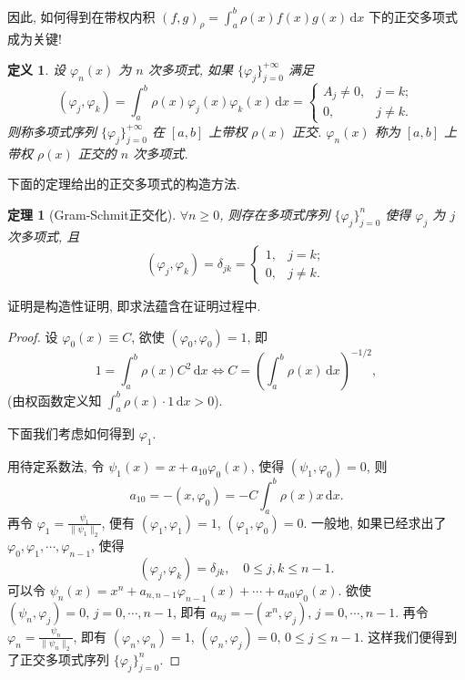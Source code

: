 \documentclass[UTF8, a4paper, 11pt]{ctexart}
\newtheorem{definition}{定义}[section]
\newtheorem{theorem}{定理}[section]
\begin{document}
因此, 如何得到在带权内积 $ (f, g)_{\rho} = \int_a^b \rho(x) f(x) g(x) \, \mathrm{d} x $ 下的正交多项式成为关键!
\begin{definition}
    设 $ \varphi_n(x) $ 为 $ n $ 次多项式, 如果 $ \{\varphi_j\}_{j=0}^{+\infty} $ 满足
\[ (\varphi_j, \varphi_k) = \int_a^b \rho(x) \varphi_j(x) \varphi_k(x) \, \mathrm{d} x = \left\{
\begin{array}{ll}
A_j \neq 0, & j = k; \\
0, & j \neq k.
\end{array}
\right. \]
则称多项式序列 $ \{\varphi_j\}_{j=0}^{+\infty} $ 在 $[a, b]$ 上带权 $ \rho(x) $ 正交. $ \varphi_n(x) $ 称为 $[a, b]$ 上带权 $ \rho(x) $ 正交的 $ n $ 次多项式.
\end{definition}
下面的定理给出的正交多项式的构造方法. 
\begin{theorem}[Gram-Schmit正交化]
    $ \forall n \geq 0 $, 则存在多项式序列 $ \{\varphi_j\}_{j=0}^n $ 使得 $ \varphi_j $ 为 $ j $ 次多项式, 且
\[ (\varphi_j, \varphi_k) = \delta_{jk} = \left\{
\begin{array}{ll}
1, & j = k; \\
0, & j \neq k.
\end{array}
\right. \]
\end{theorem}
证明是构造性证明, 即求法蕴含在证明过程中. 
\begin{proof}
    设 $ \varphi_0(x) \equiv C $, 欲使 $ (\varphi_0, \varphi_0) = 1 $, 即
    \[ 1 = \int_a^b \rho(x) C^2 \, \mathrm{d} x \iff C = \left( \int_a^b \rho(x) \, \mathrm{d} x \right)^{-1/2}, \]
    (由权函数定义知 $ \int_a^b \rho(x) \cdot 1 \, \mathrm{d} x > 0 $).

    下面我们考虑如何得到 $ \varphi_1 $. 
    
    用待定系数法, 令 $ \psi_1(x) = x + a_{10} \varphi_0(x) $, 使得 $ (\psi_1, \varphi_0) = 0 $, 则
    \[a_{10} = -(x, \varphi_0) = -C \int_a^b \rho(x) x \, \mathrm{d} x. \]
    再令 $ \varphi_1 = \frac{\psi_1}{\| \psi_1 \|_2} $, 便有 $ (\varphi_1, \varphi_1) = 1 $, $ (\varphi_1, \varphi_0) = 0 $.
    一般地, 如果已经求出了 $ \varphi_0, \varphi_1, \cdots, \varphi_{n-1} $, 使得
    \[ (\varphi_j, \varphi_k) = \delta_{jk}, \quad 0 \leq j, k \leq n - 1. \]
    可以令 $ \psi_n(x) = x^n + a_{n,n-1} \varphi_{n-1}(x) + \cdots + a_{n0} \varphi_0(x) $. 欲使 $ (\psi_n, \varphi_j) = 0, \, j = 0, \cdots, n - 1 $, 即有 $ a_{nj} = -(x^n, \varphi_j), \, j = 0, \cdots, n - 1 $. 再令 $ \varphi_n = \frac{\psi_n}{\| \psi_n \|_2} $, 即有 $ (\varphi_n, \varphi_n) = 1 $, $ (\varphi_n, \varphi_j) = 0, \, 0 \leq j \leq n - 1 $. 这样我们便得到了正交多项式序列 $ \{\varphi_j\}_{j=0}^n $. 
\end{proof}
\end{document}

